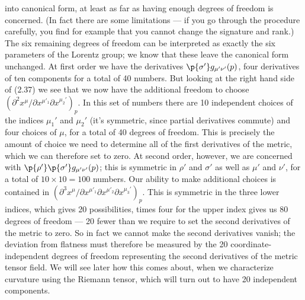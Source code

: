 \documentclass[12pt]{article}
\begin{document}
into canonical form, at least as far as having enough degrees of
freedom is concerned.  (In fact there are some limitations --- if you go
through the procedure carefully, you find for example that you cannot
change the signature and rank.)  The six remaining degrees of freedom can
be interpreted as exactly the six parameters of the Lorentz group;
we know that these leave the canonical form unchanged.  At first
order we have the derivatives $\p{\sigma'}g_{\mu'\nu'}(p)$, four
derivatives of ten components for a total of 40 numbers.  But looking
at the right hand side of (2.37) we see that we now have the additional
freedom to choose $(\partial^2 x^\mu/\partial x^{\mu'_1}
\partial x^{\mu_2'})_p$.  In this set of numbers there are 10 
independent choices of the indices $\mu_1'$ and $\mu_2'$ (it's symmetric, 
since partial derivatives commute) and four choices of $\mu$, for
a total of 40 degrees of freedom.  This is precisely the amount of
choice we need to determine all of the first derivatives of the metric,
which we can therefore set to zero.  At second order, however, we are
concerned with $\p{\rho'}\p{\sigma'}g_{\mu'\nu'}(p)$; this is symmetric
in $\rho'$ and $\sigma'$ as well as $\mu'$ and $\nu'$, for a total of
$10\times 10=100$ numbers.  Our ability to make additional choices
is contained in $(\partial^3 x^\mu/\partial x^{\mu'_1}\partial x^{\mu'_2}
\partial x^{\mu_3'})_p$.  This is symmetric in the three lower indices,
which gives 20 possibilities, times four for the upper index gives us
80 degrees of freedom --- 20 fewer than we require to set the second
derivatives of the metric to zero.  So in fact we cannot make the second
derivatives vanish; the deviation from flatness must therefore be
measured by the 20 coordinate-independent degrees of freedom representing
the second derivatives of the 
metric tensor field.  We will see later how this comes about, when we
characterize curvature using the Riemann tensor, which will turn out
to have 20 independent components.
\end{document}
